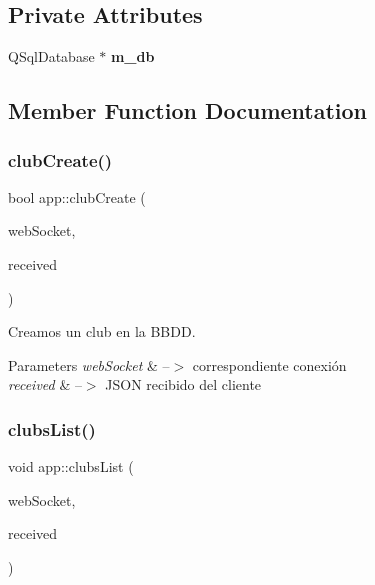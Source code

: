 \subsection*{Private Attributes}
\begin{DoxyCompactItemize}
\item 
\mbox{\label{classapp_a68f450976044452caeb444182c5166ff}} 
Q\+Sql\+Database $\ast$ {\bfseries m\+\_\+db}
\end{DoxyCompactItemize}


\subsection{Member Function Documentation}
\mbox{\label{classapp_afb7363d3bc58746f8c71425ba6050db1}} 
\subsubsection{\texorpdfstring{club\+Create()}{clubCreate()}}
{\footnotesize\ttfamily bool app\+::club\+Create (\begin{DoxyParamCaption}\item[{ix\+::\+Web\+Socket $\ast$}]{web\+Socket,  }\item[{\mbox{\hyperlink{classnlohmann_1_1basic__json}{J\+S\+ON}}}]{received }\end{DoxyParamCaption})}



Creamos un club en la B\+B\+DD. 


\begin{DoxyParams}{Parameters}
{\em web\+Socket} & --$>$ correspondiente conexión \\
\hline
{\em received} & --$>$ J\+S\+ON recibido del cliente \\
\hline
\end{DoxyParams}
\mbox{\label{classapp_aacb1fe686708ce187073676232491baf}} 
\subsubsection{\texorpdfstring{clubs\+List()}{clubsList()}}
{\footnotesize\ttfamily void app\+::clubs\+List (\begin{DoxyParamCaption}\item[{ix\+::\+Web\+Socket $\ast$}]{web\+Socket,  }\item[{\mbox{\hyperlink{classnlohmann_1_1basic__json}{J\+S\+ON}}}]{received }\end{DoxyParamCaption})}



